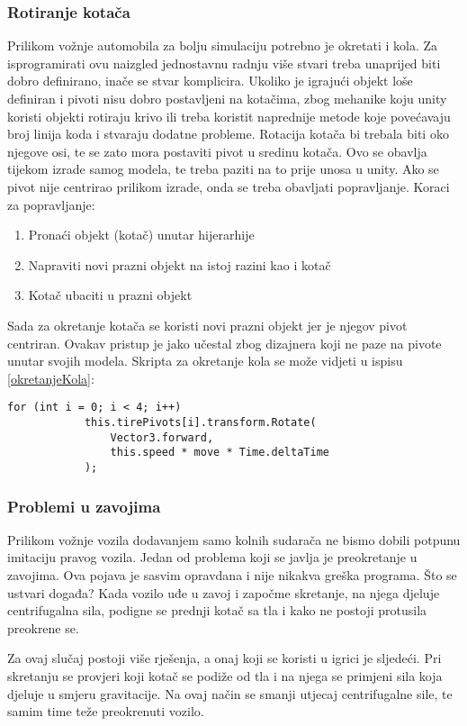 \subsubsection{Rotiranje kotača}
Prilikom vožnje automobila za bolju simulaciju potrebno je okretati i kola. Za isprogramirati ovu naizgled jednostavnu radnju više stvari treba unaprijed biti dobro definirano, inače se stvar komplicira. Ukoliko je igrajući objekt loše definiran i pivoti nisu dobro postavljeni na kotačima, zbog mehanike koju unity koristi objekti rotiraju krivo ili treba koristit naprednije metode koje povećavaju broj linija koda i stvaraju dodatne probleme. Rotacija kotača bi trebala biti oko njegove osi, te se zato mora postaviti pivot u sredinu kotača. Ovo se obavlja tijekom izrade samog modela, te treba paziti na to prije unosa u unity. Ako se pivot nije centrirao prilikom izrade, onda se treba obavljati popravljanje. Koraci za popravljanje:
\newpage
\begin{enumerate}
	\item Pronaći objekt (kotač) unutar hijerarhije
	\item Napraviti novi prazni objekt na istoj razini kao i kotač
	\item Kotač ubaciti u prazni objekt
\end{enumerate}
Sada za okretanje kotača se koristi novi prazni objekt jer je njegov pivot centriran. Ovakav pristup je jako učestal zbog dizajnera koji ne paze na pivote unutar svojih modela. Skripta za okretanje kola se može vidjeti u ispisu \ref{okretanjeKola}:
\begin{lstlisting}[caption={Skripta za okretanje kola}, label=okretanjeKola]
for (int i = 0; i < 4; i++) 
			this.tirePivots[i].transform.Rotate(
			    Vector3.forward, 
			    this.speed * move * Time.deltaTime
			);	
\end{lstlisting}
\newpage
\subsubsection{Problemi u zavojima}
Prilikom vožnje vozila dodavanjem samo kolnih sudarača ne bismo dobili potpunu imitaciju pravog vozila. Jedan od problema koji se javlja je preokretanje u zavojima. Ova pojava je sasvim opravdana i nije nikakva greška programa. Što se ustvari događa? Kada vozilo uđe u zavoj i započme skretanje, na njega djeluje centrifugalna sila, podigne se prednji kotač sa tla i kako ne postoji protusila preokrene se. \par
Za ovaj slučaj postoji više rješenja, a onaj koji se koristi u igrici je sljedeći. Pri skretanju se provjeri koji kotač se podiže od tla i na njega se primjeni sila koja djeluje u smjeru gravitacije. Na ovaj način se smanji utjecaj centrifugalne sile, te samim time teže preokrenuti vozilo.